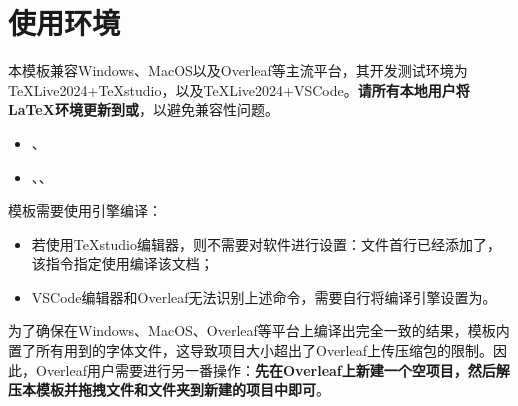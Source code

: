 \documentclass[doctor, vlined]{DissertUESTC}
\begin{document}
	\section{使用环境}

	本模板兼容Windows、MacOS以及Overleaf等主流平台，其开发测试环境为TeXLive2024+TeXstudio，以及TeXLive2024+VSCode。\textbf{请所有本地用户将LaTeX环境更新到\href{https://mirrors.tuna.tsinghua.edu.cn/tex-historic-archive/systems/texlive/}{\color{DarkRed}}或\href{https://mirrors.tuna.tsinghua.edu.cn/tex-historic-archive/systems/mactex/}{\color{DarkRed}}}，以避免兼容性问题。

	\begin{itemize}
		\item \href{https://zhuanlan.zhihu.com/p/389394015}{\color{DarkRed}}、\href{https://blog.csdn.net/ChrisP_333/article/details/82943508}{\color{DarkRed}}
		\item \href{https://texstudio.sourceforge.net/#download}{\color{DarkRed}}、\href{https://code.visualstudio.com/Download}{\color{DarkRed}}、\href{https://zhuanlan.zhihu.com/p/166523064}{\color{DarkRed}}
	\end{itemize}
	
	模板需要使用引擎编译：
	\begin{itemize}
		\item 若使用TeXstudio编辑器，则不需要对软件进行设置：文件首行已经添加了，该指令指定使用编译该文档；
		
		\item VSCode编辑器和Overleaf无法识别上述命令，需要自行将编译引擎设置为。
	\end{itemize}
	

	为了确保在Windows、MacOS、Overleaf等平台上编译出完全一致的结果，模板内置了所有用到的字体文件，这导致项目大小超出了Overleaf上传压缩包的限制。因此，Overleaf用户需要进行另一番操作：\textbf{先在Overleaf上新建一个空项目，然后解压本模板并拖拽文件和文件夹到新建的项目中即可}。
\end{document}
